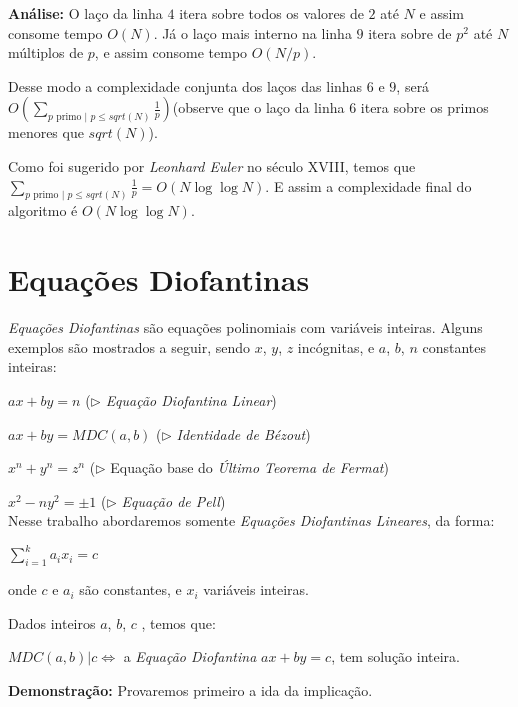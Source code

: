 \textbf{Análise:}
O laço da linha $4$ itera sobre todos os valores de $2$ até $N$ e assim consome tempo $O(N)$.
Já o laço mais interno na linha $9$ itera sobre de $p^2$ até $N$ múltiplos de $p$, e assim consome tempo
$O(N/p)$. 

Desse modo a complexidade conjunta dos laços das linhas $6$ e $9$, será $O(\sum_{p \text{ primo | }p\leq sqrt(N)} \frac{1}{p})$(observe que o laço da linha $6$ itera sobre os primos menores que $sqrt(N)$). 

Como foi sugerido por \textit{Leonhard Euler} no século XVIII, temos que $\sum_{p \text{ primo | }p\leq sqrt(N)} \frac{1}{p} = O(N\log \log N)$. E assim a complexidade final do algoritmo é $O(N \log \log N)$.

\section{Equações Diofantinas}

\textit{Equações Diofantinas} são equações polinomiais com variáveis inteiras. Alguns exemplos são mostrados a seguir, sendo $x$, $y$, $z$ incógnitas, e $a$, $b$, $n$ constantes inteiras:

$ax + by = n$ ($\triangleright$ \textit{Equação Diofantina Linear})

$ax + by = MDC(a,b)$ ($\triangleright$ \textit{Identidade de Bézout})

$x^n + y^n = z^n$ ($\triangleright$ Equação base do \textit{Último Teorema de Fermat})

$x^2 - ny^2 = \pm 1$ ($\triangleright$ \textit{Equação de Pell})\\



Nesse trabalho abordaremos somente \textit{Equações Diofantinas Lineares}, da forma:

$\sum_{i=1}^{k}a_i x_i = c$

onde $c$ e $a_i$ são constantes, e $x_i$ variáveis inteiras.\\


\begin{theorem}\label{equacao_diofantina_implicacao}
Dados inteiros $a$, $b$, $c$ , temos que:

$MDC(a,b)|c \Leftrightarrow$ a \textit{Equação Diofantina} $ax + by=c$, tem solução inteira.
\end{theorem}
\textbf{Demonstração:}
Provaremos primeiro a ida da implicação.

